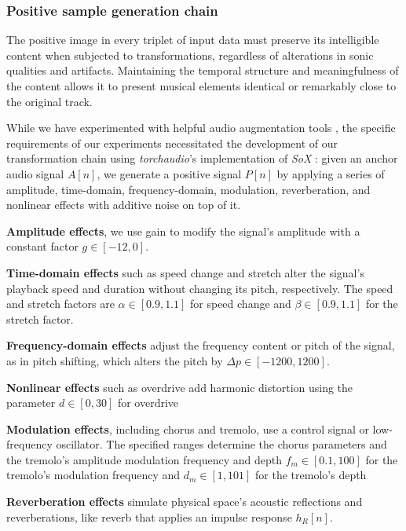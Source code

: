\subsubsection{Positive sample generation chain}

The positive image in every triplet of input data must preserve its intelligible content when subjected to transformations, regardless of alterations in sonic qualities and artifacts. Maintaining the temporal structure and meaningfulness of the content allows it to present musical elements identical or remarkably close to the original track.

While we have experimented with helpful audio augmentation tools \cite{Spijkervet2021Spijkervet/torchaudio-augmentations:V1.0, Kharitonov2020DataDomain}, the specific requirements of our experiments necessitated the development of our transformation chain using \textit{torchaudio}'s \cite{Yang2021TorchAudio:Processing} implementation of \textit{SoX} \cite{sox}: given an anchor audio signal $A[n]$, we generate a positive signal $P[n]$ by applying a series of amplitude, time-domain, frequency-domain, modulation, reverberation, and nonlinear effects with additive noise on top of it. 

\textbf{Amplitude effects}, we use gain to modify the signal's amplitude with a constant factor $g \in [-12, 0]$.

\textbf{Time-domain effects} such as speed change and stretch alter the signal's playback speed and duration without changing its pitch, respectively. The speed and stretch factors are $\alpha \in [0.9, 1.1]$ for speed change and $\beta \in [0.9, 1.1]$ for the stretch factor.

\textbf{Frequency-domain effects} adjust the frequency content or pitch of the signal, as in pitch shifting, which alters the pitch by $\Delta p \in [-1200, 1200]$.

\textbf{Nonlinear effects} such as overdrive add harmonic distortion using the parameter $d \in [0, 30]$ for overdrive

\textbf{Modulation effects}, including chorus and tremolo, use a control signal or low-frequency oscillator. The specified ranges determine the chorus parameters and the tremolo's amplitude modulation frequency and depth $f_m \in [0.1, 100]$ for the tremolo's modulation frequency and $d_m \in [1, 101]$ for the tremolo's depth

\textbf{Reverberation effects} simulate physical space's acoustic reflections and reverberations, like reverb that applies an impulse response $h_R[n]$. 

